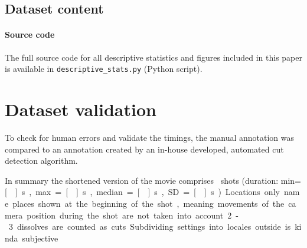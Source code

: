 \documentclass[10pt,a4paper,twocolumn]{article}
\begin{document}
\subsection*{Dataset content}


\paragraph{Source code}

The full source code for all descriptive statistics and figures included in
this paper is available in \texttt{descriptive\_stats.py} (Python script).


\section*{Dataset validation}

To check for human errors and validate the timings, the manual annotation was
compared to an annotation created by an in-house developed, automated cut
detection algorithm.

In summary the shortened version of the movie comprises
\NShots\ shots (duration: min=\unit[\ShotLengthMin]{s},
max=\unit[\ShotLengthMax]{s}, median=\unit[\ShotLengthMedian]{s},
SD=\unit[\ShotLengthSD]{s}).



Locations only name places shown at the beginning of the shot, meaning 
movements of the camera position during the shot are not taken into account.
2-3 dissolves are counted as cuts
Subdividing settings into locales outside is kinda subjective 

\end{document}
